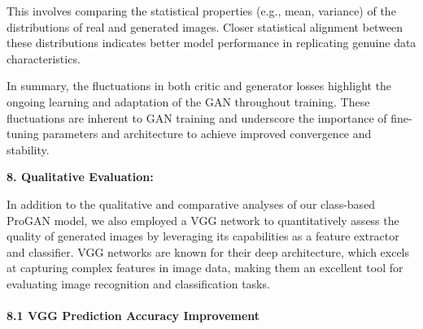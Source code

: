 \documentclass[
]{article}
\begin{document}
This involves comparing the statistical properties (e.g., mean,
variance) of the distributions of real and generated images. Closer
statistical alignment between these distributions indicates better model
performance in replicating genuine data characteristics.

In summary, the fluctuations in both critic and generator losses
highlight the ongoing learning and adaptation of the GAN throughout
training. These fluctuations are inherent to GAN training and underscore
the importance of fine-tuning parameters and architecture to achieve
improved convergence and stability.



\textbf{8. Qualitative Evaluation:}

In addition to the qualitative and comparative analyses of our
class-based ProGAN model, we also employed a VGG network to
quantitatively assess the quality of generated images by leveraging its
capabilities as a feature extractor and classifier. VGG networks are
known for their deep architecture, which excels at capturing complex
features in image data, making them an excellent tool for evaluating
image recognition and classification tasks.

\hypertarget{vgg-prediction-accuracy-improvement}{%
\paragraph{\texorpdfstring{\textbf{8.1 VGG Prediction Accuracy
Improvement}}{8.1 VGG Prediction Accuracy Improvement}}\label{vgg-prediction-accuracy-improvement}}
\end{document}
